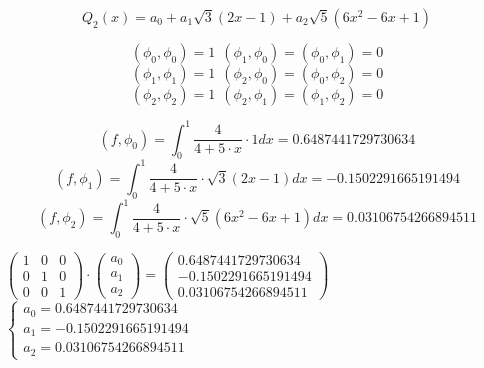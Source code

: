 \begin{displaymath}
Q_2(x) = a_0 + a_1 \sqrt{3}(2x - 1) + a_2 \sqrt{5}(6x^2 - 6x + 1)
\end{displaymath}

\begin{displaymath}
(\phi_0, \phi_0) = 1 \ \ (\phi_1, \phi_0) = (\phi_0, \phi_1) = 0
\end{displaymath}
\begin{displaymath}
(\phi_1, \phi_1) = 1 \ \ (\phi_2, \phi_0) = (\phi_0, \phi_2) = 0
\end{displaymath}
\begin{displaymath}
(\phi_2, \phi_2) = 1 \ \ (\phi_2, \phi_1) = (\phi_1, \phi_2) = 0
\end{displaymath}

\begin{displaymath}
(f, \phi_0) = \int_0^1 \frac{4}{4 + 5 \cdot x} \cdot 1 dx = 0.6487441729730634
\end{displaymath}
\begin{displaymath}
(f, \phi_1) = \int_0^1 \frac{4}{4 + 5 \cdot x} \cdot \sqrt{3} (2x - 1) dx = -0.1502291665191494
\end{displaymath}
\begin{displaymath}
(f, \phi_2) = \int_0^1 \frac{4}{4 + 5 \cdot x} \cdot \sqrt{5} (6x^2 - 6x + 1) dx = 0.03106754266894511
\end{displaymath}

$
\begin{pmatrix}
1 & 0 & 0
\\
0 & 1 & 0
\\
0 & 0 & 1
\end{pmatrix}
\cdot
\begin{pmatrix}
a_0
\\
a_1
\\
a_2
\end{pmatrix}
=
\begin{pmatrix}
0.6487441729730634
\\
-0.1502291665191494
\\
0.03106754266894511
\end{pmatrix}
$\\[1mm]

$
 \begin{cases}
  a_0 = 0.6487441729730634
\\
  a_1 = -0.1502291665191494
\\
  a_2 = 0.03106754266894511
 \end{cases}
$\\[1mm]

